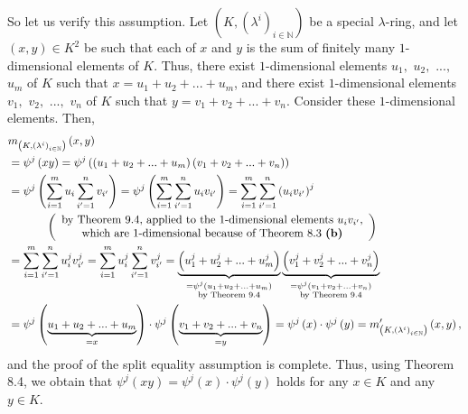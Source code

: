 \documentclass[numbers=enddot,12pt,final,onecolumn,notitlepage]{scrartcl}%
\begin{document}
So let us verify this assumption. Let $\left(  K,\left(  \lambda^{i}\right)
_{i\in\mathbb{N}}\right)  $ be a special $\lambda$-ring, and let $\left(
x,y\right)  \in K^{2}$ be such that each of $x$ and $y$ is the sum of finitely
many $1$-dimensional elements of $K$. Thus, there exist $1$-dimensional
elements $u_{1},$ $u_{2},$ $...,$ $u_{m}$ of $K$ such that $x=u_{1}%
+u_{2}+...+u_{m}$, and there exist $1$-dimensional elements $v_{1},$ $v_{2},$
$...,$ $v_{n}$ of $K$ such that $y=v_{1}+v_{2}+...+v_{n}$. Consider these
$1$-dimensional elements. Then,%
\begin{align*}
&  m_{\left(  K,\left(  \lambda^{i}\right)  _{i\in\mathbb{N}}\right)  }\left(
x,y\right) \\
&  =\psi^{j}\left(  xy\right)  =\psi^{j}\left(  \left(  u_{1}+u_{2}%
+...+u_{m}\right)  \left(  v_{1}+v_{2}+...+v_{n}\right)  \right) \\
&  =\psi^{j}\left(  \sum_{i=1}^{m}u_{i}\sum_{i^{\prime}=1}^{n}v_{i^{\prime}%
}\right)  =\psi^{j}\left(  \sum_{i=1}^{m}\sum_{i^{\prime}=1}^{n}%
u_{i}v_{i^{\prime}}\right)  =\sum_{i=1}^{m}\sum_{i^{\prime}=1}^{n}\left(
u_{i}v_{i^{\prime}}\right)  ^{j}\\
&  \ \ \ \ \ \ \ \ \ \ \left(
\begin{array}
[c]{c}%
\text{by Theorem 9.4, applied to the }1\text{-dimensional elements }%
u_{i}v_{i^{\prime}}\text{,}\\
\text{which are }1\text{-dimensional because of Theorem 8.3 \textbf{(b)}}%
\end{array}
\right) \\
&  =\sum_{i=1}^{m}\sum_{i^{\prime}=1}^{n}u_{i}^{j}v_{i^{\prime}}^{j}%
=\sum_{i=1}^{m}u_{i}^{j}\sum_{i^{\prime}=1}^{n}v_{i^{\prime}}^{j}%
=\underbrace{\left(  u_{1}^{j}+u_{2}^{j}+...+u_{m}^{j}\right)  }%
_{\substack{=\psi^{j}\left(  u_{1}+u_{2}+...+u_{m}\right)  \\\text{by Theorem
9.4}}}\underbrace{\left(  v_{1}^{j}+v_{2}^{j}+...+v_{n}^{j}\right)
}_{\substack{=\psi^{j}\left(  v_{1}+v_{2}+...+v_{n}\right)  \\\text{by Theorem
9.4}}}\\
&  =\psi^{j}\left(  \underbrace{u_{1}+u_{2}+...+u_{m}}_{=x}\right)  \cdot
\psi^{j}\left(  \underbrace{v_{1}+v_{2}+...+v_{n}}_{=y}\right)  =\psi
^{j}\left(  x\right)  \cdot\psi^{j}\left(  y\right)  =m_{\left(  K,\left(
\lambda^{i}\right)  _{i\in\mathbb{N}}\right)  }^{\prime}\left(  x,y\right)  ,
\end{align*}
and the proof of the split equality assumption is complete. Thus, using
Theorem 8.4, we obtain that $\psi^{j}\left(  xy\right)  =\psi^{j}\left(
x\right)  \cdot\psi^{j}\left(  y\right)  $ holds for any $x\in K$ and any
$y\in K$.
\end{document}
